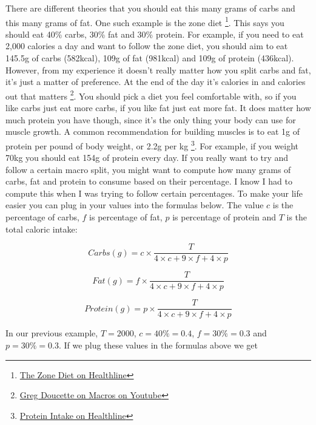 \documentclass[openany, 12pt]{book}
\begin{document}
	There are different theories that you should eat this many grams of carbs and this many grams of fat. One such example is the zone diet
        \footnote{\href{https://www.healthline.com/nutrition/zone-diet}{The Zone Diet on Healthline}}. This says you should eat 40\% carbs, 30\% fat and 30\% protein. For example,
	if you need to eat 2,000 calories a day and want to follow the zone diet, you should aim to eat 145.5g of carbs (582kcal), 109g of fat (981kcal) and 109g of protein (436kcal).
	However, from my experience it doesn't really matter how you split carbs and fat, it's just a matter of preference. At the end of the day it's calories in and calories out that matters
        \footnote{\href{https://www.youtube.com/watch?v=ssmJ50HRTp8}{Greg Doucette on Macros on Youtube}}. You should pick a diet you feel comfortable with, so if you like carbs
        just eat more carbs, if you like fat just eat more fat. It does matter how much protein you have though, since it's the only thing your body can use for muscle growth. A common
        recommendation for building muscles is to eat 1g of protein per pound of body weight, or 2.2g per kg
        \footnote{\href{https://www.healthline.com/nutrition/how-much-protein-per-day}{Protein Intake on Healthline}}. For example, if you weight 70kg you should eat 154g of protein every day.
	If you really want to try and follow a certain macro split, you might want to compute how many grams of carbs, fat and protein to consume based on their percentage. I know
	I had to compute this when I was trying to follow certain percentages. To make your life easier you can plug in your values into the formulas below. The value $c$ is the 
	percentage of carbs, $f$ is percentage of fat, $p$ is percentage of protein and $T$ is the total caloric intake:
	
	\begin{equation}
		Carbs(g) = c \times \frac{T}{4 \times c + 9 \times f + 4 \times p}
	\end{equation}
	
	\begin{equation}
		Fat(g) = f \times \frac{T}{4 \times c + 9 \times f + 4 \times p}
	\end{equation}
		
	\begin{equation}
		Protein(g) = p \times \frac{T}{4 \times c + 9 \times f + 4 \times p}
	\end{equation}
	
	In our previous example, $T = 2000$, $c = 40\% = 0.4$, $f = 30\% = 0.3$ and $p = 30\% = 0.3$. If we plug these values in the formulas above we get
	
\end{document}
